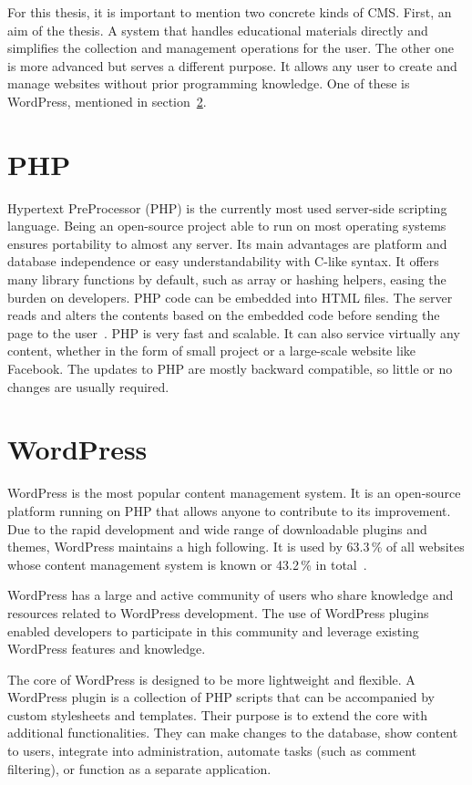 \documentclass[
  digital,     %
  oneside,     %
  nosansbold,  %
  colorbold, %
  lof,         %
  lot,         %
]{fithesis4}
\begin{document}
For this thesis, it is important to mention two concrete kinds of CMS. First, an aim
of the thesis. A system that handles educational materials directly and simplifies
the collection and management operations for the user. The other one is more advanced
but serves a different purpose. It allows any user to create and manage websites
without prior programming knowledge. One of these is WordPress, mentioned in
section~\ref{sect:wordpress}.

\section{PHP}

Hypertext PreProcessor (PHP) is the currently most used \mbox{server-side} scripting
language. Being an \mbox{open-source} project able to run on most operating systems
ensures portability to almost any server. Its main advantages are platform and database
independence or easy understandability with \mbox{C-like} syntax. It offers many
library functions by default, such as array or hashing helpers, easing the burden
on developers. PHP code can be embedded into HTML files. The server reads and
alters the contents based on the embedded code before sending the page to the
user~\parencite[page.~30]{welling17}. PHP is very fast and scalable. It can also
service virtually any content, whether in the form of small project or
a \mbox{large-scale} website like Facebook. The updates to PHP are mostly backward
compatible, so little or no changes are usually required.

\section{WordPress}
\label{sect:wordpress}

WordPress is the most popular content management system. It is an \mbox{open-source}
platform running on PHP that allows anyone to contribute to its improvement.
Due to the rapid development and wide range of downloadable plugins and themes,
WordPress maintains a high following. It is used by 63.3\,\% of all websites whose
content management system is known or 43.2\,\% in total~\cite{w3_wordpress}.

WordPress has a large and active community of users who share knowledge and
resources related to WordPress development. The use of WordPress plugins
enabled developers to participate in this community and leverage existing
WordPress features and knowledge.

The core of WordPress is designed to be more lightweight and flexible. A WordPress
plugin is a collection of PHP scripts that can be accompanied by custom stylesheets
and templates. Their purpose is to extend the core with additional functionalities.
They can make changes to the database, show content to users, integrate into
administration, automate tasks (such as comment filtering), or function as
a separate application.
\end{document}
